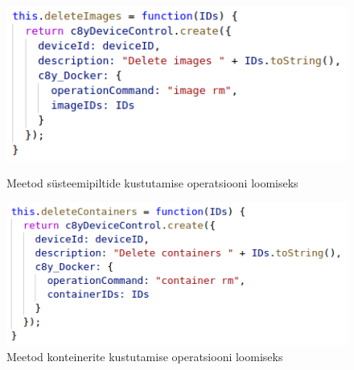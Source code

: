 \documentclass[12pt]{article}
\begin{document}
 
  \begin{figure} [ht]
   \centering
   \begin{minipage}{0.45\textwidth}
     \centering
     \includegraphics[width=1.0\textwidth]{webplugin_deleteimages} %
     \caption{Meetod süsteemipiltide kustutamise operatsiooni loomiseks}
     \label{fig:webplugin_deleteimages}
   \end{minipage}\hfill
   \begin{minipage}{0.45\textwidth}
     \centering
     \includegraphics[width=1.0\textwidth]{webplugin_deletecontainers} %
     \caption{Meetod konteinerite kustutamise operatsiooni loomiseks}
     \label{fig:webplugin_deletecontainers}
   \end{minipage}
  \end{figure}
 
\end{document}
